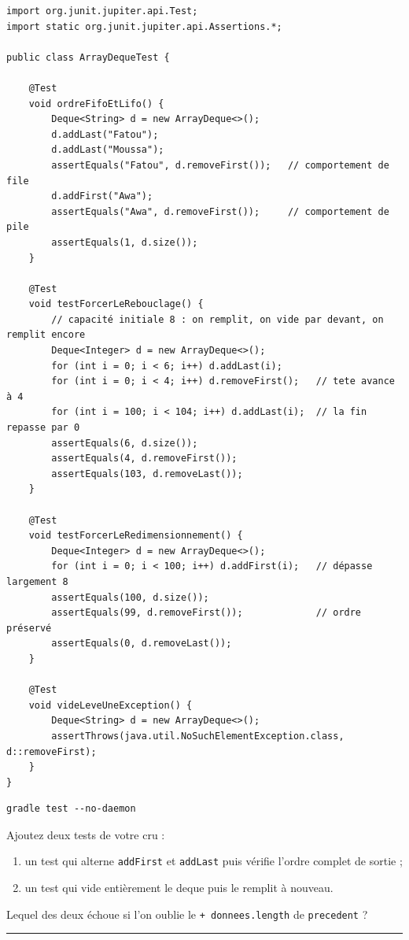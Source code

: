 \documentclass[11pt,a4paper]{article}
\newcommand{\lig}[1]{\rule{#1}{0.4pt}}
\begin{document}
\begin{lstlisting}[caption={Tests JUnit fournis}]
import org.junit.jupiter.api.Test;
import static org.junit.jupiter.api.Assertions.*;

public class ArrayDequeTest {

    @Test
    void ordreFifoEtLifo() {
        Deque<String> d = new ArrayDeque<>();
        d.addLast("Fatou");
        d.addLast("Moussa");
        assertEquals("Fatou", d.removeFirst());   // comportement de file
        d.addFirst("Awa");
        assertEquals("Awa", d.removeFirst());     // comportement de pile
        assertEquals(1, d.size());
    }

    @Test
    void testForcerLeRebouclage() {
        // capacité initiale 8 : on remplit, on vide par devant, on remplit encore
        Deque<Integer> d = new ArrayDeque<>();
        for (int i = 0; i < 6; i++) d.addLast(i);
        for (int i = 0; i < 4; i++) d.removeFirst();   // tete avance à 4
        for (int i = 100; i < 104; i++) d.addLast(i);  // la fin repasse par 0
        assertEquals(6, d.size());
        assertEquals(4, d.removeFirst());
        assertEquals(103, d.removeLast());
    }

    @Test
    void testForcerLeRedimensionnement() {
        Deque<Integer> d = new ArrayDeque<>();
        for (int i = 0; i < 100; i++) d.addFirst(i);   // dépasse largement 8
        assertEquals(100, d.size());
        assertEquals(99, d.removeFirst());             // ordre préservé
        assertEquals(0, d.removeLast());
    }

    @Test
    void videLeveUneException() {
        Deque<String> d = new ArrayDeque<>();
        assertThrows(java.util.NoSuchElementException.class, d::removeFirst);
    }
}
\end{lstlisting}

\begin{lstlisting}[style=bash,caption={Lancer les tests}]
gradle test --no-daemon
\end{lstlisting}

\begin{exercicebox}
Ajoutez deux tests de votre cru :
\begin{enumerate}[nosep]
    \item un test qui alterne \texttt{addFirst} et \texttt{addLast} puis
          vérifie l'ordre complet de sortie ;
    \item un test qui vide entièrement le deque puis le remplit à nouveau.
\end{enumerate}
Lequel des deux échoue si l'on oublie le \texttt{+ donnees.length} de
\texttt{precedent} ? \lig{6cm}
\end{exercicebox}
\end{document}
